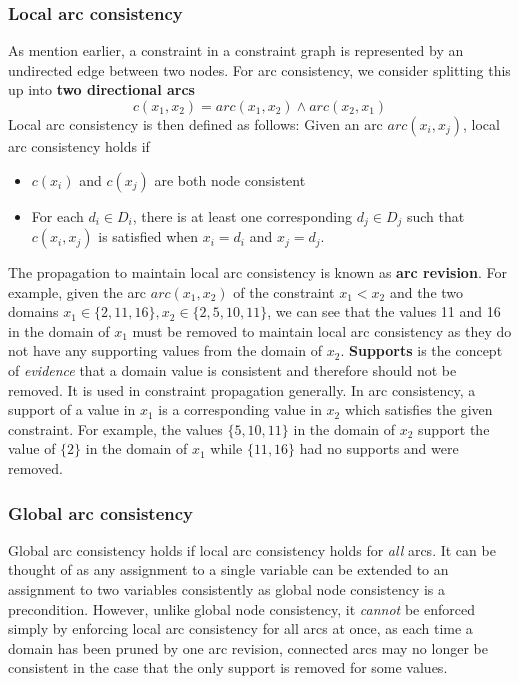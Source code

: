 \documentclass[CS4402-Notes.tex]{subfiles}
\begin{document}
\subsubsection{Local arc consistency}
As mention earlier, a constraint in a constraint graph is represented by an undirected edge between two nodes. For arc consistency, we consider splitting this up into \textbf{two directional arcs}
\begin{equation}
c(x_1,x_2) = arc(x_1,x_2) \wedge arc(x_2,x_1)
\end{equation}
Local arc consistency is then defined as follows:
\n
Given an arc $arc(x_i, x_j)$, local arc consistency holds if
\begin{itemize}
\item $c(x_i)$ and $c(x_j)$ are both node consistent
\item For each $d_i \in D_i$, there is at least one corresponding $d_j \in D_j$ such that $c(x_i, x_j)$ is satisfied when $x_i = d_i$ and $x_j = d_j$.
\end{itemize}
The propagation to maintain local arc consistency is known as \textbf{arc revision}. For example, given the arc $arc(x_1, x_2)$ of the constraint $x_1 < x_2$ and the two domains $x_1 \in \{2,11,16\}, x_2 \in \{2,5,10,11\}$, we can see that the values 11 and 16 in the domain of $x_1$ must be removed to maintain local arc consistency as they do not have any supporting values from the domain of $x_2$.
\n
\textbf{Supports} is the concept of \textit{evidence} that a domain value is consistent and therefore should not be removed. It is used in constraint propagation generally. In arc consistency, a support of a value in $x_1$ is a corresponding value in $x_2$ which satisfies the given constraint. For example, the values $\{5,10,11\}$ in the domain of $x_2$ support the value of $\{2\}$ in the domain of $x_1$ while $\{11,16\}$ had no supports and were removed.

\subsubsection{Global arc consistency}
Global arc consistency holds if local arc consistency holds for \textit{all} arcs. It can be thought of as any assignment to a single variable can be extended to an assignment to two variables consistently as global node consistency is a precondition.
\n
However, unlike global node consistency, it \textit{cannot} be enforced simply by enforcing local arc consistency for all arcs at once, as each time a domain has been pruned by one arc revision, connected arcs may no longer be consistent in the case that the only support is removed for some values.
\end{document}

